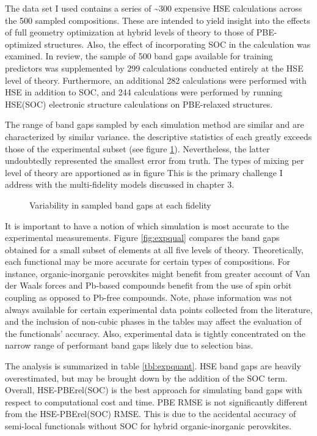 The data set I used contains a series of \textasciitilde{}300 expensive HSE calculations across the 500 sampled compositions.
These are intended to yield insight into the effects of full geometry optimization at hybrid levels of theory to those of PBE-optimized structures.
Also, the effect of incorporating SOC in the calculation was examined.
In review, the sample of 500 band gaps available for training predictors was supplemented by 299 calculations conducted entirely at the HSE level of theory.
Furthermore, an additional 282 calculations were performed with HSE in addition to SOC, and 244 calculations were performed by running HSE(SOC) electronic structure calculations on PBE-relaxed structures.

The range of band gaps sampled by each simulation method are similar and are characterized by similar variance.
the descriptive statistics of each greatly exceeds those of the experimental subset (see figure \ref{fig:bg_dist}).
Nevertheless, the latter undoubtedly represented the smallest error from truth.
The types of mixing per level of theory are apportioned as in figure
This is the primary challenge I address with the multi-fidelity models discussed in chapter 3.

 
\begin{figure}[htbp]
\centering

\caption{\label{fig:bg_dist} Variability in sampled band gaps at each fidelity}
\end{figure}

It is important to have a notion of which simulation is most accurate to the experimental measurements.
Figure \ref{fig:expqual} compares the band gaps obtained for a small subset of elements at all five levels of theory.
Theoretically, each functional may be more accurate for certain types of compositions.
For instance, organic-inorganic perovskites might benefit from greater account of Van der Waals forces and Pb-based compounds benefit from the use of spin orbit coupling as opposed to Pb-free compounds.
Note, phase information was not always available for certain experimental data points collected from the literature, and the inclusion of non-cubic phases in the tables may affect the evaluation of the functionals' accuracy.
Also, experimental data is tightly concentrated on the narrow range of performant band gaps likely due to selection bias.

The analysis is summarized in table \ref{tbl:expquant}.
HSE band gaps are heavily overestimated, but may be brought down by the addition of the SOC term.
Overall, HSE-PBErel(SOC) is the best approach for simulating band gaps with respect to computational cost and time.
PBE RMSE is not significantly different from the HSE-PBErel(SOC) RMSE.
This is due to the accidental accuracy of semi-local functionals without SOC for hybrid organic-inorganic perovskites.
\autocite{mannodi-kanakkithodi-2019-compr-comput,mannodi-kanakkithodi-2022-data-driven}

